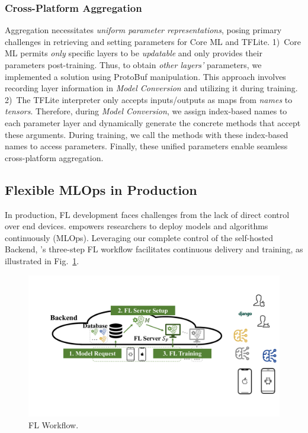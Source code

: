 \documentclass[conference]{IEEEtran}
\begin{document}
\subsubsection{Cross-Platform Aggregation}
Aggregation necessitates
\textit{uniform parameter representations},
posing primary challenges in
retrieving and setting parameters for Core ML and TFLite.
1)~Core ML permits \textit{only} specific layers to be \textit{updatable} and
only provides their parameters post-training.
Thus, to obtain \textit{other layers'} parameters,
we implemented a solution using ProtoBuf manipulation.
This approach involves recording layer information
in \textit{Model Conversion} and
utilizing it during training.
2)~The TFLite interpreter only accepts inputs/outputs as maps from
\textit{names} to \textit{tensors}.
Therefore, during \textit{Model Conversion},
we assign index-based names to each parameter layer and
dynamically generate the concrete methods that accept these arguments.
During training, we call the methods with these index-based names to
access parameters.
Finally, these unified parameters enable seamless cross-platform aggregation.

\subsection{Flexible MLOps in Production}
\label{sec:mlops}
\newcommand{\model}{$M$}
\newcommand{\fs}{$S_\mathrm F$}
In production,
FL development faces challenges from
the lack of direct control over end devices.
\FedKit{} empowers researchers to deploy models and algorithms continuously (MLOps).
Leveraging our complete control of the self-hosted Backend,
\FedKit{}'s three-step FL workflow
facilitates continuous delivery and training,
as illustrated in Fig.~\ref{fig:fl-workflow}.

\begin{figure}
    \centering
    \includegraphics*[width=0.8\linewidth]{fl_workflow.pdf}
    \vspace{-1mm}
    \caption{\FedKit{} FL Workflow.}
    \label{fig:fl-workflow}
    \vspace{-1mm}
\end{figure}
\end{document}
